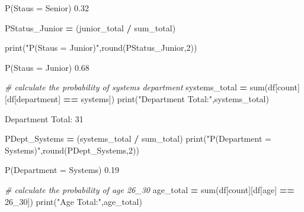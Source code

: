 \documentclass[
]{article}
\newenvironment{Shaded}{\begin{snugshade}}{\end{snugshade}}
\newcommand{\BuiltInTok}[1]{#1}
\newcommand{\CommentTok}[1]{\textcolor[rgb]{0.56,0.35,0.01}{\textit{#1}}}
\newcommand{\DecValTok}[1]{\textcolor[rgb]{0.00,0.00,0.81}{#1}}
\newcommand{\NormalTok}[1]{#1}
\newcommand{\OperatorTok}[1]{\textcolor[rgb]{0.81,0.36,0.00}{\textbf{#1}}}
\newcommand{\StringTok}[1]{\textcolor[rgb]{0.31,0.60,0.02}{#1}}
\begin{document}
P(Staus = Senior) 0.32

\begin{Shaded}
\begin{Highlighting}[]
\NormalTok{PStatus\_Junior }\OperatorTok{=}\NormalTok{ (junior\_total }\OperatorTok{/}\NormalTok{ sum\_total)}

\BuiltInTok{print}\NormalTok{(}\StringTok{"P(Staus = Junior)"}\NormalTok{,}\BuiltInTok{round}\NormalTok{(PStatus\_Junior,}\DecValTok{2}\NormalTok{))}
\end{Highlighting}
\end{Shaded}

P(Staus = Junior) 0.68

\begin{Shaded}
\begin{Highlighting}[]
\CommentTok{\# calculate the probability of systems department}
\NormalTok{systems\_total }\OperatorTok{=} \BuiltInTok{sum}\NormalTok{(df[}\StringTok{\textquotesingle{}count\textquotesingle{}}\NormalTok{][df[}\StringTok{\textquotesingle{}department\textquotesingle{}}\NormalTok{] }\OperatorTok{==} \StringTok{\textquotesingle{}systems\textquotesingle{}}\NormalTok{])}
\BuiltInTok{print}\NormalTok{(}\StringTok{"Department Total:"}\NormalTok{,systems\_total)}
\end{Highlighting}
\end{Shaded}

Department Total: 31

\begin{Shaded}
\begin{Highlighting}[]
\NormalTok{PDept\_Systems }\OperatorTok{=}\NormalTok{ (systems\_total }\OperatorTok{/}\NormalTok{ sum\_total)}
\BuiltInTok{print}\NormalTok{(}\StringTok{"P(Department = Systems)"}\NormalTok{,}\BuiltInTok{round}\NormalTok{(PDept\_Systems,}\DecValTok{2}\NormalTok{))}
\end{Highlighting}
\end{Shaded}

P(Department = Systems) 0.19

\begin{Shaded}
\begin{Highlighting}[]
\CommentTok{\# calculate the probability of age 26\_30}
\NormalTok{age\_total }\OperatorTok{=} \BuiltInTok{sum}\NormalTok{(df[}\StringTok{\textquotesingle{}count\textquotesingle{}}\NormalTok{][df[}\StringTok{\textquotesingle{}age\textquotesingle{}}\NormalTok{] }\OperatorTok{==} \StringTok{\textquotesingle{}26\_30\textquotesingle{}}\NormalTok{])}
\BuiltInTok{print}\NormalTok{(}\StringTok{"Age Total:"}\NormalTok{,age\_total)}
\end{Highlighting}
\end{Shaded}
\end{document}
